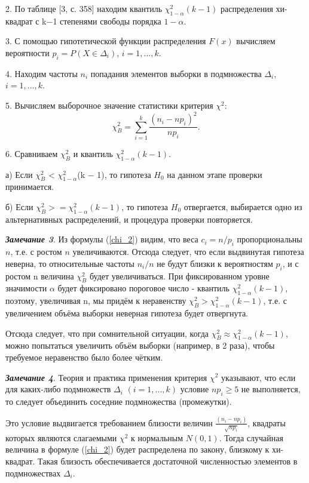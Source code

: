 \documentclass[a4paper]{article}
\begin{document}
2. По таблице [3, с. 358] находим квантиль $\chi^{2}_{1-\alpha}(k - 1)$ распределения хи-квадрат с k$-$1 степенями свободы порядка $1-\alpha$. 

3. С помощью гипотетической функции распределения $F(x)$ вычисляем вероятности $p_{i} = P (X \in \Delta_{i})$, $i = 1, ... ,k$.

4. Находим частоты $n_{i}$ попадания элементов выборки в подмножества $\Delta_{i}$, $i = 1, ... ,k$. 

5. Вычисляем выборочное значение статистики критерия $\chi^{2}$:
\begin{equation}
\chi^{2}_{B} =\sum_{i = 1}^{k}{\frac{(n_{i} - np_{i})^{2}}{np_{i}}}.
\label{chi_B}
\end{equation}

6. Сравниваем $\chi^{2}_{B}$ и квантиль $\chi^{2}_{1-\alpha}(k-1)$.

а) Если $\chi^{2}_{B}$ < $\chi^{2}_{1-\alpha}$(k $-$ 1), то гипотеза $H_{0}$ на данном этапе проверки принимается. 

б) Если $\chi^{2}_{B} >= \chi^{2}_{1-\alpha}(k -1)$, то гипотеза $H_{0}$ отвергается, выбирается одно из альтернативных распределений, и процедура проверки повторяется.

\textbf{\textit{Замечание 3}}. Из формулы (\ref{chi_2}) видим, что веса $c_i = n/p_{i}$ пропорциональны $n$, т.е. с ростом $n$ увеличиваются. Отсюда следует, что если выдвинутая гипотеза неверна, то относительные частоты $n_{i}/n$ не будут близки к вероятностям $p_{i}$, и с ростом n величина  $\chi^{2}_{B}$  будет увеличиваться. При фиксированном уровне значимости $\alpha$ будет фиксировано пороговое число - квантиль $\chi^{2}_{1-\alpha}(k-1)$, поэтому, увеличивая n, мы придём к неравенству $\chi^{2}_{B} > \chi^{2}_{1-\alpha}(k-1)$, т.е. с увеличением объёма выборки неверная гипотеза будет отвергнута.

Отсюда следует, что при сомнительной ситуации, когда $\chi^{2}_{B} \approx \chi^{2}_{1-\alpha}(k-1)$, можно попытаться увеличить объём выборки (например, в 2 раза), чтобы требуемое неравенство было более чётким.

\textbf{\textit{Замечание 4}}. Теория и практика применения критерия  $\chi^{2}$ указывают, что если для каких-либо подмножеств $\Delta_{i}$ $(i = 1, ... ,k)$ условие $np_{i} \geq 5$ не выполняется, то следует объединить соседние подмножества (промежутки).

Это условие выдвигается требованием близости величин $\frac{(n_{i} -np_{i})}{\sqrt{np_{i}}}$, квадраты которых являются слагаемыми $\chi^{2}$  к нормальным $N(0,1)$. Тогда случайная величина в формуле (\ref{chi_2}) будет распределена по закону, близкому к хи-квадрат. Такая близость обеспечивается достаточной численностью элементов в подмножествах $\Delta_{i}$.
\end{document}
